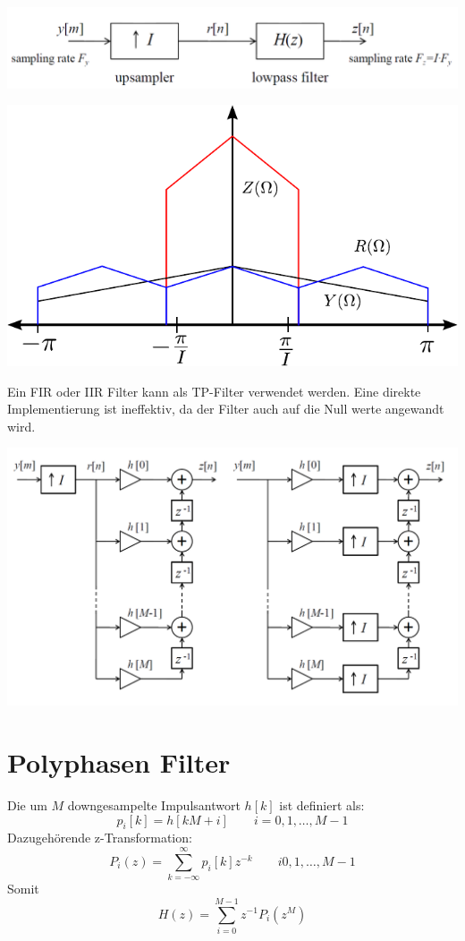 \begin{center}
	\includegraphics[scale=.7]{../fig/interpolation}
\end{center}
\begin{center}
	\includegraphics[scale=.7]{../fig/interpolation_frequenz}
\end{center}
Ein FIR oder IIR Filter kann als TP-Filter verwendet werden. Eine direkte
Implementierung ist ineffektiv, da der Filter auch auf die Null werte angewandt
wird.
\begin{center}
	\includegraphics[scale=.7]{../fig/interpolation_scheme}
\end{center}

\section{Polyphasen Filter}
Die um $M$ downgesampelte Impulsantwort $h[k]$ ist definiert als:
\[ p_i[k] = h[kM+i] \qquad i=0,1,\ldots,M-1 \]
Dazugehörende z-Transformation:
\[ P_i(z) = \sum_{k=-\infty}^{\infty} p_i[k]z^{-k} \qquad i0,1,\ldots,M-1 \]
Somit
\[ H(z) = \sum_{i=0}^{M-1}z^{-1} P_i(z^M) \]

